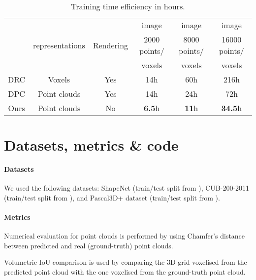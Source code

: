 \documentclass[runningheads]{llncs}
\begin{document}
\begin{table}[hbt!]
\centering
\caption{Training time efficiency in hours.}  \begin{tabular}{|c|c|c|c|c|c|}  \hline
          &\multirow{3}{*}{ representations}&\multirow{3}{*}{Rendering}&  image&  image &  image\\   &&&2000 points/&8000 points/&16000 points/\\
          &&& voxels& voxels& voxels\\
     \hline
       DRC \cite{tulsiani2017multiview}&Voxels&Yes& 14h& 60h& 216h \\
       DPC \cite{DBLP:journals/corr/abs-1810-09381}&Point clouds&Yes& 14h & 24h & 72h \\
       \hline
       Ours &Point clouds&No& \textbf{6.5}h & \textbf{11}h & \textbf{34.5}h \\
     \hline
   \end{tabular}
   \label{table:efficiency_training}
\end{table}

\FloatBarrier


\section{Datasets, metrics \& code}

\paragraph{Datasets}
We used the following datasets: ShapeNet \cite{chang2015shapenet} (train/test split from \cite{DBLP:journals/corr/abs-1810-09381}), CUB-200-2011 \cite{Wah2011TheCB} (train/test split from \cite{kanazawa2018learning}), and Pascal3D+ dataset \cite{xiang_wacv14} (train/test split from \cite{kanazawa2018learning}).

\paragraph{Metrics}
Numerical evaluation for point clouds is performed by using Chamfer's distance \cite{sun2018pix3d} between predicted and real (ground-truth) point clouds.

Volumetric IoU \cite{niemeyer2020differentiable} comparison is used by comparing the 3D grid voxelised from the predicted point cloud with the one voxelised from the ground-truth point cloud.
\end{document}
